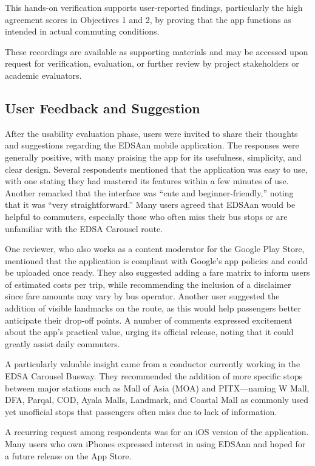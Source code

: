 \documentclass[journal]{./IEEE/IEEEtran}
\begin{document}
This hands-on verification supports user-reported findings, particularly the high agreement scores in Objectives 1 and 2, by proving that the app functions as intended in actual commuting conditions.

These recordings are available as supporting materials and may be accessed upon request for verification, evaluation, or further review by project stakeholders or academic evaluators.

\subsection{User Feedback and Suggestion}
After the usability evaluation phase, users were invited to share their thoughts and suggestions regarding the EDSAan mobile application. The responses were generally positive, with many praising the app for its usefulness, simplicity, and clear design. Several respondents mentioned that the application was easy to use, with one stating they had mastered its features within a few minutes of use. Another remarked that the interface was “cute and beginner-friendly,” noting that it was “very straightforward.” Many users agreed that EDSAan would be helpful to commuters, especially those who often miss their bus stops or are unfamiliar with the EDSA Carousel route.

One reviewer, who also works as a content moderator for the Google Play Store, mentioned that the application is compliant with Google’s app policies and could be uploaded once ready. They also suggested adding a fare matrix to inform users of estimated costs per trip, while recommending the inclusion of a disclaimer since fare amounts may vary by bus operator. Another user suggested the addition of visible landmarks on the route, as this would help passengers better anticipate their drop-off points. A number of comments expressed excitement about the app’s practical value, urging its official release, noting that it could greatly assist daily commuters.

A particularly valuable insight came from a conductor currently working in the EDSA Carousel Busway. They recommended the addition of more specific stops between major stations such as Mall of Asia (MOA) and PITX—naming W Mall, DFA, Parqal, COD, Ayala Malls, Landmark, and Coastal Mall as commonly used yet unofficial stops that passengers often miss due to lack of information.

A recurring request among respondents was for an iOS version of the application. Many users who own iPhones expressed interest in using EDSAan and hoped for a future release on the App Store.
\end{document}
